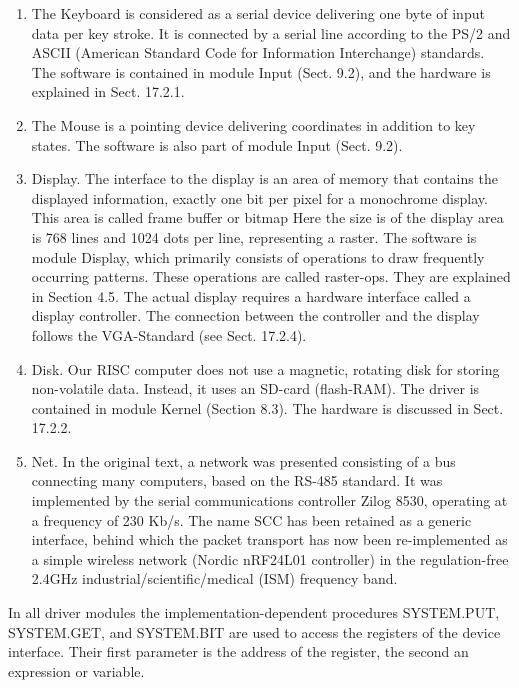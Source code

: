 \begin{enumerate}
	\item The Keyboard is considered as a serial device delivering one byte of input data per key stroke. It
is connected by a serial line according to the PS/2 and ASCII (American Standard Code for
Information Interchange) standards. The software is contained in module Input (Sect. 9.2), and the
hardware is explained in Sect. 17.2.1.
	\item The Mouse is a pointing device delivering coordinates in addition to key states. The software is
also part of module Input (Sect. 9.2).
	\item Display. The interface to the display is an area of memory that contains the displayed
information, exactly one bit per pixel for a monochrome display. This area is called frame buffer or
bitmap Here the size is of the display area is 768 lines and 1024 dots per line, representing a
raster. The software is module Display, which primarily consists of operations to draw frequently
occurring patterns. These operations are called raster-ops. They are explained in Section 4.5. The
actual display requires a hardware interface called a display controller. The connection between the
controller and the display follows the VGA-Standard (see Sect. 17.2.4).
	\item Disk. Our RISC computer does not use a magnetic, rotating disk for storing non-volatile data.
Instead, it uses an SD-card (flash-RAM). The driver is contained in module Kernel (Section 8.3).
The hardware is discussed in Sect. 17.2.2.
	\item Net. In the original text, a network was presented consisting of a bus connecting many
computers, based on the RS-485 standard. It was implemented by the serial communications
controller Zilog 8530, operating at a frequency of 230 Kb/s. The name SCC has been retained as a
generic interface, behind which the packet transport has now been re-implemented as a simple
wireless
network
(Nordic
nRF24L01
controller)
in
the
regulation-free
2.4GHz
industrial/scientific/medical (ISM) frequency band.
\end{enumerate}

In all driver modules the implementation-dependent procedures SYSTEM.PUT, SYSTEM.GET, and
SYSTEM.BIT are used to access the registers of the device interface. Their first parameter is the
address of the register, the second an expression or variable.

